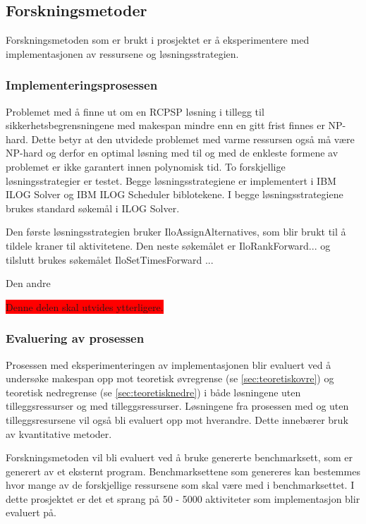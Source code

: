 \subsection{Forskningsmetoder}
Forskningsmetoden som er brukt i prosjektet er å eksperimentere med implementasjonen av ressursene og løsningsstrategien.

\subsubsection{Implementeringsprosessen}
Problemet med å finne ut om en RCPSP løsning i tillegg til sikkerhetsbegrensningene med makespan mindre enn en gitt frist finnes er NP-hard. Dette betyr at den utvidede problemet med varme ressursen også må være NP-hard og derfor en optimal løsning med til og med de enkleste formene av problemet er ikke garantert innen polynomisk tid. To forskjellige løsningsstrategier er testet. Begge løsningsstrategiene er implementert i IBM ILOG Solver og IBM ILOG Scheduler biblotekene. I begge løsningsstrategiene brukes standard søkemål i ILOG Solver.

Den første løsningsstrategien bruker IloAssignAlternatives, som blir brukt til å tildele kraner til aktivitetene. Den neste søkemålet er IloRankForward... og tilslutt brukes søkemålet IloSetTimesForward ...

Den andre

\colorbox{red}{Denne delen skal utvides ytterligere.}

\subsubsection{Evaluering av prosessen}
Prosessen med eksperimenteringen av implementasjonen blir evaluert ved å undersøke makespan opp mot teoretisk øvregrense (se \ref{sec:teoretiskovre}) og teoretisk nedregrense (se \ref{sec:teoretisknedre}) i både løsningene uten tilleggsressurser og med tilleggsressurser. Løsningene fra prosessen med og uten tilleggsresursene vil også bli evaluert opp mot hverandre. Dette innebærer bruk av kvantitative metoder.

Forskningsmetoden vil bli evaluert ved å bruke genererte benchmarksett, som er generert av et eksternt program. Benchmarksettene som genereres kan bestemmes hvor mange av de forskjellige ressursene som skal være med i benchmarksettet. I dette prosjektet er det et sprang på 50 - 5000 aktiviteter som implementasjon blir evaluert på.

